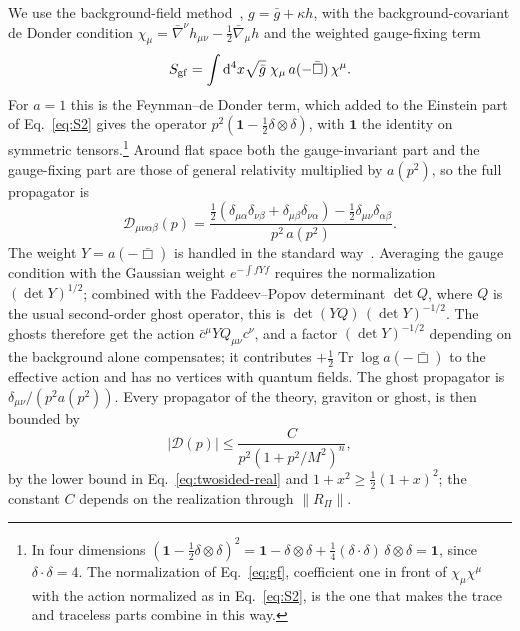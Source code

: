 \documentclass[aps,prd,10pt,twocolumn,superscriptaddress,nofootinbib,floatfix,longbibliography]{revtex4-2}
\newcommand{\dd}{\mathrm{d}}
\newcommand{\Tr}{\operatorname{Tr}}
\begin{document}
We use the background-field method~\cite{Abbott1981}, $g=\bar g+\kappa h$, with the background-covariant de Donder condition $\chi_\mu=\bar\nabla^\nu h_{\mu\nu}-\frac12\bar\nabla_\mu h$ and the weighted gauge-fixing term
\begin{equation}
\label{eq:gf}
S_{\rm gf}=\int\dd^4x\sqrt{\bar g}\;\chi_\mu\,a(-\bar\Box)\,\chi^\mu .
\end{equation}
For $a=1$ this is the Feynman--de Donder term, which added to the Einstein part of Eq.~\eqref{eq:S2} gives the operator $p^2(\mathbf 1-\frac12\delta\otimes\delta)$, with $\mathbf 1$ the identity on symmetric tensors.\footnote{In four dimensions $(\mathbf 1-\frac12\delta\otimes\delta)^2=\mathbf 1-\delta\otimes\delta+\frac14(\delta\cdot\delta)\,\delta\otimes\delta=\mathbf 1$, since $\delta\cdot\delta=4$. The normalization of Eq.~\eqref{eq:gf}, coefficient one in front of $\chi_\mu\chi^\mu$ with the action normalized as in Eq.~\eqref{eq:S2}, is the one that makes the trace and traceless parts combine in this way.} Around flat space both the gauge-invariant part and the gauge-fixing part are those of general relativity multiplied by $a(p^2)$, so the full propagator is
\begin{equation}
\label{eq:propfull}
\mathcal D_{\mu\nu\alpha\beta}(p)=\frac{\frac12(\delta_{\mu\alpha}\delta_{\nu\beta}+\delta_{\mu\beta}\delta_{\nu\alpha})-\frac12\delta_{\mu\nu}\delta_{\alpha\beta}}{p^2\,a(p^2)}.
\end{equation}
The weight $Y=a(-\bar\Box)$ is handled in the standard way~\cite{Nielsen1978,Kallosh1978}. Averaging the gauge condition with the Gaussian weight $e^{-\int fYf}$ requires the normalization $(\det Y)^{1/2}$; combined with the Faddeev--Popov determinant $\det Q$, where $Q$ is the usual second-order ghost operator, this is $\det(YQ)\,(\det Y)^{-1/2}$. The ghosts therefore get the action $\bar c^\mu YQ_{\mu\nu}c^\nu$, and a factor $(\det Y)^{-1/2}$ depending on the background alone compensates; it contributes $+\frac12\Tr\log a(-\bar\Box)$ to the effective action and has no vertices with quantum fields. The ghost propagator is $\delta_{\mu\nu}/(p^2a(p^2))$. Every propagator of the theory, graviton or ghost, is then bounded by
\begin{equation}
\label{eq:propbound}
|\mathcal D(p)|\le\frac{C}{p^2(1+p^2/M^2)^{n}},
\end{equation}
by the lower bound in Eq.~\eqref{eq:twosided-real} and $1+x^2\ge\frac12(1+x)^2$; the constant $C$ depends on the realization through $\|R_\Pi\|$.
\end{document}
